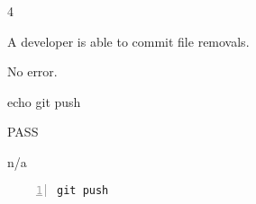 \begin{description}[align=right,leftmargin=3.2cm,labelindent=3.0cm]
\item[Step:] 4
\item[Confirm:] A developer is able to commit file removals.
\item[Expectation:] No error.
\item[Command:] echo git  push
\item[Test Result:] PASS
\item[Evidence:] n/a
\end{description}
\begin{lstlisting}[numbers=left]
git push

\end{lstlisting}
